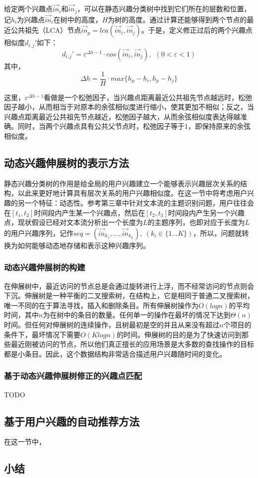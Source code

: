 给定两个兴趣点$\vec{in}_i$和$\vec{in}_j$，可以在静态兴趣分类树中找到它们所在的层数和位置，记$h_i$为兴趣点$\vec{in}_i$在树中的高度，$H$为树的高度。通过计算还能够得到两个节点的最近公共祖先（LCA）节点$\vec{in}_p=lca(\vec{in}_i,\vec{in}_j)$。于是，定义修正过后的两个兴趣点相似度$d_{i,j}'$如下：
\begin{equation}
  d_{i,j}'=\varepsilon^{\Delta h-1}\cdot cos(\vec{in}_i,\vec{in}_j),~~(0<\varepsilon<1)
\end{equation}
其中，
\begin{equation*}
\Delta h=\frac{1}{H}\cdot max\{h_p-h_i,h_p-h_j\}
\end{equation*}

这里，$\varepsilon^{\Delta h-1}$看做是一个松弛因子，当兴趣点距离最近公共祖先节点越远时，松弛因子越小，从而相当于对原本的余弦相似度进行缩小，使其更加不相似；反之，当兴趣点距离最近公共祖先节点越近，松弛因子越大，从而余弦相似度表达得越准确。同时，当两个兴趣点具有公共父节点时，松弛因子等于1，即保持原来的余弦相似度。

\subsection{动态兴趣伸展树的表示方法}
静态兴趣分类树的作用是给全局的用户兴趣建立一个能够表示兴趣层次关系的结构，以此来更好地计算具有层次关系的用户兴趣相似度。在这一节中将考虑用户兴趣的另一个特征：动态性。参考第三章中针对文本流的主题识别问题，用户往往会在$[t_1,t_2]$时间段内产生某一个兴趣点，然后在$[t_2,t_3]$时间段内产生另一个兴趣点，现状假设已经对文本流分析出一个长度为$L$的主题序列，也即对应于长度为$L$的用户兴趣序列，记作$seq=(\vec{in}_{k_1},...,\vec{in}_{k_L}),~(k_i\in\{1...K\})$，所以，问题就转换为如何能够动态地存储和表示这种兴趣序列。

\subsubsection{动态兴趣伸展树的构建}
在伸展树中，最近访问的节点总是会通过旋转进行上浮，而不经常访问的节点则会下沉。伸展树是一种平衡的二叉搜索树，在结构上，它是相同于普通二叉搜索树，唯一不同的在于算法寻找，插入和删除条目。所有伸展树操作为$O(log n)$的平均时间，其中$n$为在树中的条目的数量。任何单一的操作在最坏的情况下达到$\Theta(n)$时间。但任何对伸展树的连续操作，且树最初是空的并且从来没有超过$n$个项目的条件下，最坏情况下需要$O(K log n)$的时间。伸展树的目的是为了快速访问到那些最近刚被访问的节点，所以他们真正擅长的应用场景是大多数的查找操作的目标都是小条目。因此，这个数据结构非常适合描述用户兴趣随时间的变化。

\subsubsection{基于动态兴趣伸展树修正的兴趣点匹配}
TODO

\subsection{基于用户兴趣的自动推荐方法}
在这一节中，

\subsection{小结}
